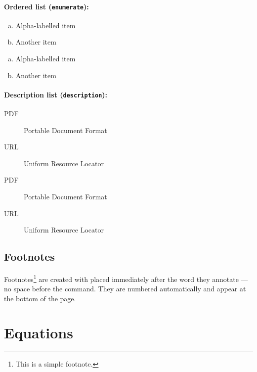 \paragraph{Ordered list (\texttt{enumerate}):}
\begin{latexcode}
\begin{enumerate}[a)]
  \item Alpha-labelled item
  \item Another item
\end{enumerate}
\end{latexcode}
\begin{enumerate}[a)]
  \item Alpha-labelled item
  \item Another item
\end{enumerate}

\paragraph{Description list (\texttt{description}):}
\begin{latexcode}
\begin{description}
  \item[PDF] Portable Document Format
  \item[URL] Uniform Resource Locator
\end{description}
\end{latexcode}
\begin{description}
  \item[PDF] Portable Document Format
  \item[URL] Uniform Resource Locator
\end{description}


\subsection{Footnotes}
\label{sub:footnotes}

Footnotes\footnote{This is a simple footnote.} are created with  placed immediately after the word they annotate — no space before the command.
They are numbered automatically and appear at the bottom of the page.


\section{Equations}
\label{sec:equations}

